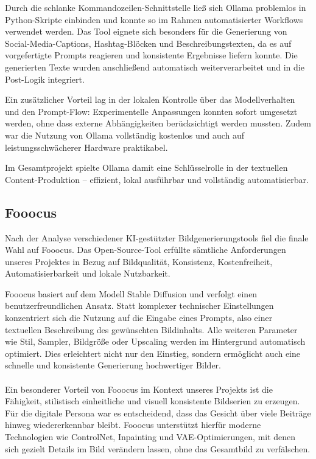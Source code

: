 \documentclass[a4paper,12pt]{article}
\begin{document}
Durch die schlanke Kommandozeilen-Schnittstelle ließ sich Ollama problemlos in Python-Skripte einbinden und konnte so im Rahmen automatisierter Workflows verwendet werden. Das Tool eignete sich besonders für die Generierung von Social-Media-Captions, Hashtag-Blöcken und Beschreibungstexten, da es auf vorgefertigte Prompts reagieren und konsistente Ergebnisse liefern konnte. Die generierten Texte wurden anschließend automatisch weiterverarbeitet und in die Post-Logik integriert.

Ein zusätzlicher Vorteil lag in der lokalen Kontrolle über das Modellverhalten und den Prompt-Flow: Experimentelle Anpassungen konnten sofort umgesetzt werden, ohne dass externe Abhängigkeiten berücksichtigt werden mussten. Zudem war die Nutzung von Ollama vollständig kostenlos und auch auf leistungsschwächerer Hardware praktikabel.

Im Gesamtprojekt spielte Ollama damit eine Schlüsselrolle in der textuellen Content-Produktion – effizient, lokal ausführbar und vollständig automatisierbar.

\subsection{Fooocus}

Nach der Analyse verschiedener KI-gestützter Bildgenerierungstools fiel die finale Wahl auf Fooocus. Das Open-Source-Tool erfüllte sämtliche Anforderungen unseres Projektes in Bezug auf Bildqualität, Konsistenz, Kostenfreiheit, Automatisierbarkeit und lokale Nutzbarkeit.

Fooocus basiert auf dem Modell Stable Diffusion und verfolgt einen benutzerfreundlichen Ansatz. Statt komplexer technischer Einstellungen konzentriert sich die Nutzung auf die Eingabe eines Prompts, also einer textuellen Beschreibung des gewünschten Bildinhalts. Alle weiteren Parameter wie Stil, Sampler, Bildgröße oder Upscaling werden im Hintergrund automatisch optimiert. Dies erleichtert nicht nur den Einstieg, sondern ermöglicht auch eine schnelle und konsistente Generierung hochwertiger Bilder. \\\\
Ein besonderer Vorteil von Fooocus im Kontext unseres Projekts ist die Fähigkeit, stilistisch einheitliche und visuell konsistente Bildserien zu erzeugen. Für die digitale Persona war es entscheidend, dass das Gesicht über viele Beiträge hinweg wiedererkennbar bleibt. Fooocus unterstützt hierfür moderne Technologien wie ControlNet, Inpainting und VAE-Optimierungen, mit denen sich gezielt Details im Bild verändern lassen, ohne das Gesamtbild zu verfälschen.
\end{document}
